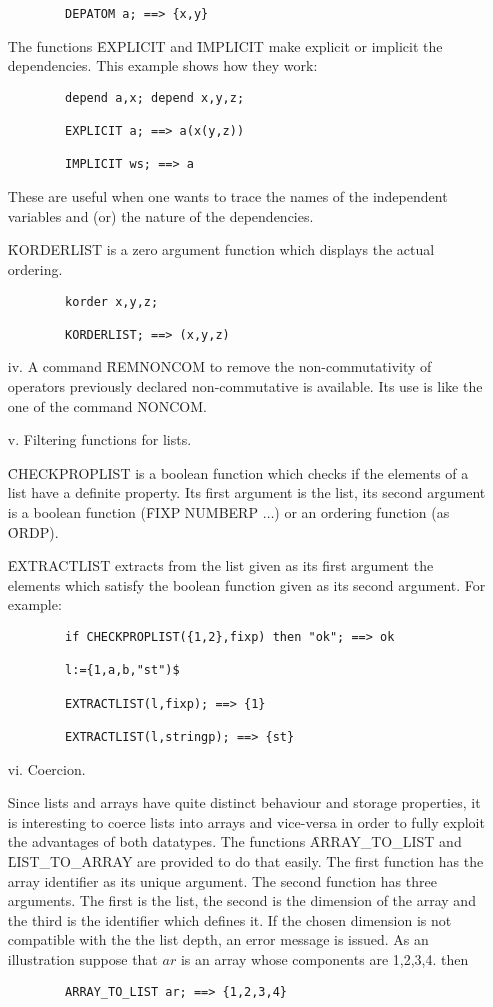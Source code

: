 \begin{itemize}
\begin{verbatim}
        DEPATOM a; ==> {x,y}
\end{verbatim}
The functions \f{EXPLICIT} and \f{IMPLICIT} make explicit or
implicit the dependencies. This example shows how they work:
\begin{verbatim}
        depend a,x; depend x,y,z;

        EXPLICIT a; ==> a(x(y,z))

        IMPLICIT ws; ==> a
\end{verbatim}
These are useful when one wants to trace the names of the independent 
variables
and (or) the nature of the dependencies.

\f{KORDERLIST} is a zero argument function which displays the actual
ordering.
\begin{verbatim}
        korder x,y,z;

        KORDERLIST; ==> (x,y,z)
\end{verbatim}

\item[iv.] A command \f{REMNONCOM} to remove the non-commutativity of 
operators previously declared non-commutative is available. Its use is like 
the one of the command \f{NONCOM}.

\item[v.] Filtering functions for lists.

\f{CHECKPROPLIST}  is a  boolean function which checks if the
elements of a list have a definite property. Its first argument
is the list, its second argument is a boolean function
(\f{FIXP NUMBERP $\ldots$}) or an ordering function (as \f{ORDP}).

\f{EXTRACTLIST} extracts from the list given as its first argument
the elements which satisfy the boolean function given as its second
argument. For example:
\begin{verbatim}
        if CHECKPROPLIST({1,2},fixp) then "ok"; ==> ok

        l:={1,a,b,"st")$

        EXTRACTLIST(l,fixp); ==> {1}

        EXTRACTLIST(l,stringp); ==> {st}
\end{verbatim}
\item[vi.] Coercion.

Since lists and arrays have quite distinct behaviour and storage properties,  
it is interesting to coerce lists into arrays and vice-versa in order to 
fully exploit the advantages of both datatypes. The functions  
\f{ARRAY\_TO\_LIST} and \f{LIST\_TO\_ARRAY} are provided to do that easily.
The first function has the array identifier as its unique argument. 
The second
function has three arguments. The first is the list, the second is the 
dimension of the array and the third is the identifier which defines it.  
If the chosen dimension is not compatible with the
the list depth, an error message is issued.  
As an illustration suppose that $ar$ is an array whose components are  
1,2,3,4. then
\begin{verbatim}
        ARRAY_TO_LIST ar; ==> {1,2,3,4}


\end{verbatim}
\end{itemize}
